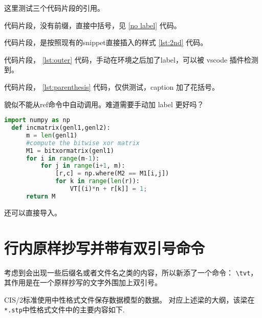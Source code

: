 \documentclass[../Main/thesis]{subfiles}
\begin{document}
这里测试三个代码片段的引用。

代码片段，没有前缀，直接中括号，见 \ref{no label} 代码。

代码片段，是按照现有的snippet直接插入的样式 \ref{lst:2nd} 代码。

代码片段， \ref{lst:outer} 代码，手动在环境之后加了label，可以被 vscode 插件检测到。

代码片段， \ref{lst:parenthesis} 代码，仅供测试，caption 加了花括号。

貌似不能从ref命令中自动调用。难道需要手动加 label 更好吗？
\begin{lstlisting}[language=Python,
  caption={Must have Parenthesis},
  label=lst:parenthesis]
  import numpy as np
  def incmatrix(genl1,genl2):
      m = len(genl1)
      #compute the bitwise xor matrix
      M1 = bitxormatrix(genl1)
      for i in range(m-1):
          for j in range(i+1, m):
              [r,c] = np.where(M2 == M1[i,j])
              for k in range(len(r)):
                  VT[(i)*n + r[k]] = 1;
      return M
\end{lstlisting}

还可以直接导入。



\section{行内原样抄写并带有双引号命令}
\label{sec:newfunction}

考虑到会出现一些后缀名或者文件名之类的内容，所以新添了一个命令：
\verb|\tvt|，
其作用是在一个原样抄写的文字外围加上双引号。

CIS/2标准使用中性格式文件保存数据模型的数据。
对应上述梁的大纲，该梁在\texttt{*.stp}中性格式文件中的主要内容如下.
\end{document}
